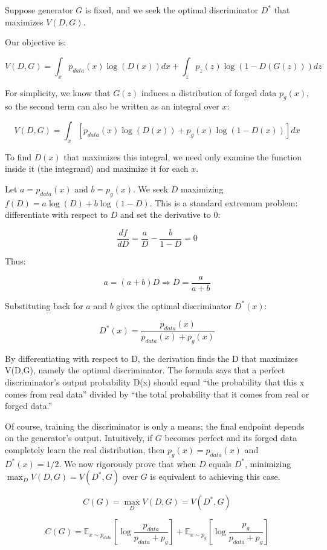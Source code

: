 Suppose generator \(G\) is fixed, and we seek the optimal discriminator \(D^*\) that maximizes \(V(D,G)\).

Our objective is:

\[
V(D,G)=\int_x p_{data}(x)\log(D(x))dx+\int_z p_z(z)\log(1-D(G(z)))dz
\]

For simplicity, we know that \(G(z)\) induces a distribution of forged data \(p_g(x)\), so the second term can also be written as an integral over \(x\):

\[
V(D,G)=\int_x [p_{data}(x)\log(D(x))+p_g(x)\log(1-D(x))]dx
\]

To find \(D(x)\) that maximizes this integral, we need only examine the function inside it (the integrand) and maximize it for each \(x\).

Let \(a=p_{data}(x)\) and \(b=p_g(x)\). We seek \(D\) maximizing \(f(D)=a\log(D)+b\log(1-D)\). This is a standard extremum problem: differentiate with respect to \(D\) and set the derivative to 0:

\[
\frac{df}{dD}=\frac{a}{D}-\frac{b}{1-D}=0
\]

Thus:

\[
a=(a+b)D \Rightarrow D=\frac{a}{a+b}
\]

Substituting back for \(a\) and \(b\) gives the optimal discriminator \(D^*(x)\):

\[
D^*(x)=\frac{p_{data}(x)}{p_{data}(x)+p_g(x)}
\]

By differentiating with respect to D, the derivation finds the D that maximizes V(D,G), namely the optimal discriminator. The formula says that a perfect discriminator's output probability D(x) should equal ``the probability that this x comes from real data'' divided by ``the total probability that it comes from real or forged data.''

Of course, training the discriminator is only a means; the final endpoint depends on the generator's output. Intuitively, if \(G\) becomes perfect and its forged data completely learn the real distribution, then \(p_g(x)=p_{data}(x)\) and \(D^*(x)=1/2\). We now rigorously prove that when \(D\) equals \(D^*\), minimizing \(\max_D V(D,G)=V(D^*,G)\) over \(G\) is equivalent to achieving this case.

\[
C(G)=\max_D V(D,G)=V(D^*,G)
\]

\[
C(G)=\mathbb{E}_{x\sim p_{data}}\left[\log\frac{p_{data}}{p_{data}+p_g}\right]
+\mathbb{E}_{x\sim p_g}\left[\log\frac{p_g}{p_{data}+p_g}\right]
\]

